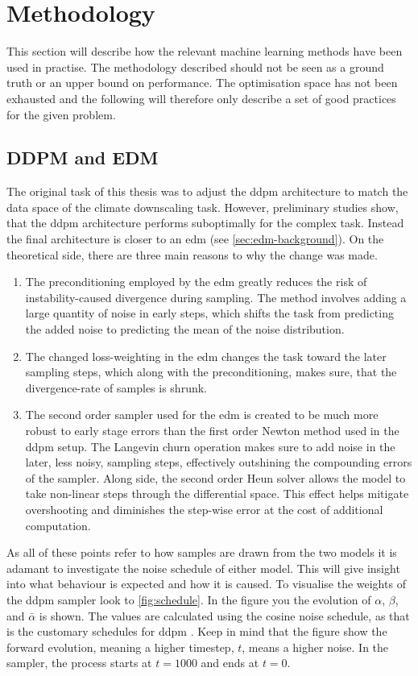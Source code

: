 \chapter{Methodology}

This section will describe how the relevant machine learning methods have been used in practise. The methodology described should not be seen as a ground truth or an upper bound on performance. The optimisation space has not been exhausted and the following will therefore only describe a set of good practices for the given problem.

\section{DDPM and EDM}

The original task of this thesis was to adjust the \gls{ddpm} architecture to match the data space of the climate downscaling task. However, preliminary studies show, that the \gls{ddpm} architecture performs suboptimally for the complex task. Instead the final architecture is closer to an \gls{edm} (see \cref{sec:edm-background}). On the theoretical side, there are three main reasons to why the change was made.
\begin{enumerate}
    \item The preconditioning employed by the \gls{edm} greatly reduces the risk of instability-caused divergence during sampling. The method involves adding a large quantity of noise in early steps, which shifts the task from predicting the added noise to predicting the mean of the noise distribution. 
    \item The changed loss-weighting in the \gls{edm} changes the task toward the later sampling steps, which along with the preconditioning, makes sure, that the divergence-rate of samples is shrunk. 
    \item The second order sampler used for the \gls{edm} is created to be much more robust to early stage errors than the first order Newton method used in the \gls{ddpm} setup. The Langevin churn operation makes sure to add noise in the later, less noisy, sampling steps, effectively outshining the compounding errors of the sampler. Along side, the second order Heun solver allows the model to take non-linear steps through the differential space. This effect helps mitigate overshooting and diminishes the step-wise error at the cost of additional computation.
\end{enumerate}

As all of these points refer to how samples are drawn from the two models it is adamant to investigate the noise schedule of either model. This will give insight into what behaviour is expected and how it is caused. To visualise the weights of the \gls{ddpm} sampler look to \cref{fig:schedule}. In the figure you the evolution of $\alpha$, $\beta$, and $\bar{\alpha}$ is shown. The values are calculated using the cosine noise schedule, as that is the customary schedules for \gls{ddpm} \cite{better-ddpm}. Keep in mind that the figure show the forward evolution, meaning a higher timestep, $t$, means a higher noise. In the sampler, the process starts at $t=1000$ and ends at $t=0$.


